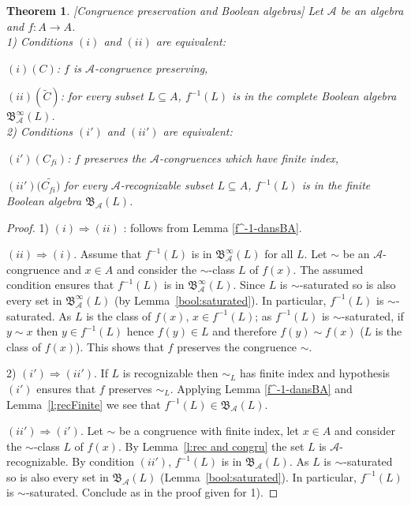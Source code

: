 \documentclass[11pt,a4paper]{article}
\newtheorem{theorem}{Theorem}[section]
\theoremstyle{definition} %
\newcommand\+[1]{\mathcal{#1}} %
\newcommand{\Bool}{{\mathfrak{B}}}   %
\newcommand{\gen}{\textit{gen}}
\begin{document}
\begin{theorem}\label{thm:cp bhull}
[Congruence preservation and Boolean algebras]
Let $\+A$ be an algebra
and $f\colon A \rightarrow A$.\\
1) Conditions $(i)$ and $(ii)$ are equivalent:

$(i)(C)$: $f$ is $\+A$-congruence preserving,

$(ii)(\widetilde C)$: for every  subset  $L\subseteq A$, $f^{-1}(L)$ is in the complete Boolean algebra $\Bool_{\+A}^\infty(L)$.
\\
2) Conditions $(i')$ and $(ii')$ are equivalent:

$(i')(C_{fi})$: $f$ preserves the $\+A$-congruences which have finite index,
%

$(ii')(\widetilde{C_{fi})}$  for every $\+A$-recognizable subset $L\subseteq A$, $f^{-1}(L)$ is in
the finite Boolean algebra $\Bool_{\+A}(L)$.
\end{theorem}
%
\begin{proof}
1)  $(i)\Longrightarrow (ii)$ :  follows from Lemma \ref{f^-1-dansBA}.

$(ii)\Longrightarrow (i)$.
Assume that $f^{-1}(L)$ is in $\Bool_{\+A}^\infty(L)$ for all $L$.
Let $\sim$ be an $\+A$-congruence and $x\in A$ 
and consider the $\sim$-class $L$ of $f(x)$.
The assumed condition ensures that $f^{-1}(L)$ is in $\Bool_{\+A}^\infty(L)$.
Since $L$ is $\sim$-saturated so is also every set in $\Bool_{\+A}^\infty(L)$
(by Lemma~\ref{bool:saturated}). In particular,  $f^{-1}(L)$ is $\sim$-saturated.
 As $L$ is the class of $f(x)$, $x\in f^{-1}(L)$; as $f^{-1}(L)$ is $\sim$-saturated,
 if $y\sim x$ then $y\in f^{-1}(L)$
hence $f(y)\in L$ and therefore $f(y)\sim f(x)$
($L$ is the class of $f(x)$).
This shows that $f$ preserves the congruence $\sim$. 

2)
$(i')\Longrightarrow (ii')$.
If $L$ is recognizable then $\sim_L$ has finite index and hypothesis $(i')$ ensures that
$f$ preserves $\sim_L$. Applying Lemma \ref{f^-1-dansBA} and Lemma~\ref{l;recFinite}
we see that $f^{-1}(L)\in\Bool_\+A(L)$.

$(ii')\Longrightarrow (i')$.
Let $\sim$ be a congruence with finite index, let $x\in A$ 
and consider the $\sim$-class $L$ of $f(x)$.
By  Lemma~\ref{l:rec and congru} the set $L$ is $\+A$-recognizable.
By condition $(ii')$,  $f^{-1}(L)$ is in $\Bool_{\+A}(L)$.
As $L$ is $\sim$-saturated so is also every set in $\Bool_{\+A}(L)$
(Lemma~\ref{bool:saturated}). In particular,  $f^{-1}(L)$ is $\sim$-saturated.
Conclude as in the proof given for  1).
\end{proof}
\end{document}
